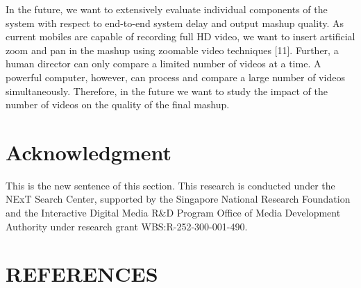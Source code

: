 \documentclass{sig-alternate}
\begin{document}
{{{In the future, we want to extensively evaluate individual components
of the system with respect to end-to-end system delay and
output mashup quality. As current mobiles are capable of recording
full HD video, we want to insert artificial zoom and pan in the
mashup using zoomable video techniques [11]. Further, a human
director can only compare a limited number of videos at a time.
A powerful computer, however, can process and compare a large
number of videos simultaneously. Therefore, in the future we want
to study the impact of the number of videos on the quality of the
final mashup.

\section*{Acknowledgment}
This is the new sentence of this section.
This research is conducted under the NExT Search Center, supported
by the Singapore National Research Foundation and the Interactive
Digital Media R&D Program Office of Media Development
Authority under research grant WBS:R-252-300-001-490.

\section{REFERENCES}

}}}
\end{document}
